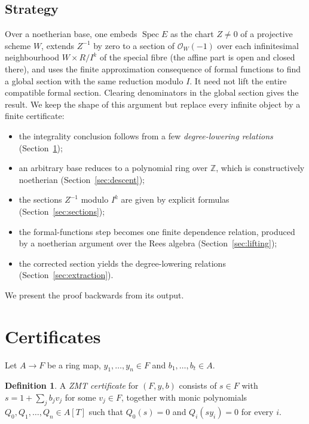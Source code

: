 \documentclass[11pt]{amsart}
\numberwithin{equation}{section}
\theoremstyle{definition}
\newtheorem{definition}[theorem]{Definition}
\theoremstyle{remark}
\newcommand{\ZZ}{\mathbb Z}
\begin{document}
\subsection*{Strategy}
Over a noetherian base, one embeds $\operatorname{Spec}E$ as the chart $Z\neq0$
of a projective scheme $W$, extends $Z^{-1}$ by zero to a section of
$\mathcal O_W(-1)$ over each infinitesimal neighbourhood $W\times R/I^k$
of the special fibre (the affine part is open and closed there), and
uses the finite approximation consequence of formal functions to find
a global section with the same reduction modulo $I$. It need not lift
the entire compatible formal section. Clearing denominators in the
global section gives the result.
We keep the shape of this argument but replace every infinite object
by a finite certificate:
\begin{itemize}
\item the integrality conclusion follows from a few
\emph{degree-lowering relations} (Section~\ref{sec:certificate});
\item an arbitrary base reduces to a polynomial ring over $\ZZ$, which
is constructively noetherian (Section~\ref{sec:descent});
\item the sections $Z^{-1}$ modulo $I^k$ are given by explicit
formulas (Section~\ref{sec:sections});
\item the formal-functions step becomes one finite dependence relation,
produced by a noetherian argument over the Rees algebra
(Section~\ref{sec:lifting});
\item the corrected section yields the degree-lowering relations
(Section~\ref{sec:extraction}).
\end{itemize}
We present the proof backwards from its output.

\section{Certificates}\label{sec:certificate}

Let $A\to F$ be a ring map, $y_1,\ldots,y_n\in F$ and
$b_1,\ldots,b_t\in A$.

\begin{definition}\label{def:cert}
A \emph{ZMT certificate} for $(F,y,b)$ consists of $s\in F$ with
$s=1+\sum_j b_jv_j$ for some $v_j\in F$, together with monic
polynomials $Q_0,Q_1,\ldots,Q_n\in A[T]$ such that $Q_0(s)=0$ and
$Q_i(sy_i)=0$ for every $i$.
\end{definition}
\end{document}
